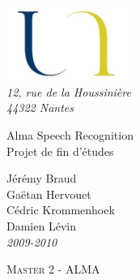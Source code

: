 \begin{titlepage}

\vspace*{2cm}



\begin{flushleft}
	\hspace{1cm} \includegraphics*[width=4cm]{images/logo.jpg}\\
	\hspace{1cm} \textsl{12, rue de la Houssinière}\\
	\hspace{1cm} \textit{44322 Nantes}
	\hrulefill
\end{flushleft}




\vspace{2cm}

\begin{flushright}

	{\fontsize{1.4cm}{1.65cm}\selectfont 
Alma Speech Recognition} 	 \\
	{\fontsize{0.7cm}{0.825cm}\selectfont 
Projet de fin d'études} 	 \\

	
	\vspace{1cm}
	

	
	\vspace{1cm}
	Jérémy Braud \\
	Gaëtan Hervouet \\
	Cédric Krommenhoek \\
	Damien Lévin \\
	\textit{2009-2010}
	
\end{flushright}


\vspace{2cm}

\begin{flushleft}



	\hspace{1cm} \textsc{Master 2 - ALMA}\\
	
\end{flushleft}

\hspace*{0,5cm}\hrulefill
\end{titlepage}
